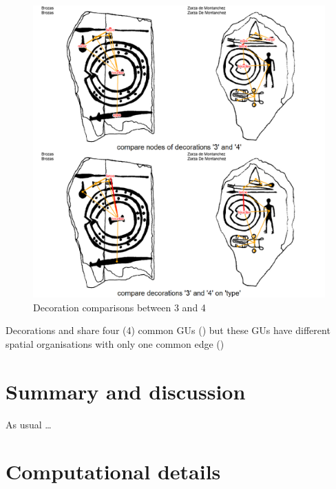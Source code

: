 \documentclass[article]{jss}\usepackage[]{graphicx}\usepackage[]{color}
\makeatletter
\def\maxwidth{ %
  \ifdim\Gin@nat@width>\linewidth
    \linewidth
  \else
    \Gin@nat@width
  \fi
}
\newenvironment{knitrout}{}{} %
\makeatother
\begin{document}
\begin{knitrout}
\begin{figure}[H]
{\centering \includegraphics[width=\maxwidth]{figure/unnamed-chunk-18-1} 

}

\caption{\label{fig:figs}Decoration comparisons between 3 and 4}\label{fig:unnamed-chunk-18}
\end{figure}


\end{knitrout}

Decorations  and  share four (4) common GUs () but  these GUs have different spatial organisations with only one common edge ()


\section{Summary and discussion} \label{sec:summary}

\begin{leftbar}
As usual \dots
\end{leftbar}



\section*{Computational details}
\end{document}
